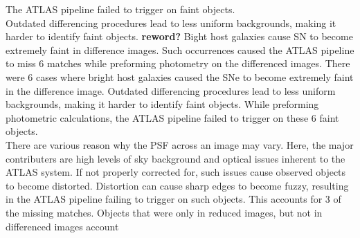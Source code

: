 	The ATLAS pipeline failed to trigger on faint objects. \\
	\indent Outdated differencing procedures lead to less uniform backgrounds, 
	making it harder to identify faint objects. {\bf reword?} 
	Bight host galaxies cause SN to become extremely faint in difference images. 
	Such occurrences caused the ATLAS pipeline to miss 6 matches while preforming 
	photometry on the differenced images.
\fi
\indent There were 6 cases where bright host galaxies caused the SNe to become extremely 
faint in the difference image. Outdated differencing procedures lead to less 
uniform backgrounds, making it harder to identify faint objects.  %
While preforming photometric calculations, the ATLAS pipeline failed to trigger 
on these 6 faint objects.\\
%
%
\indent There are various reason why the PSF across an image may vary.
Here, the major contributers are high levels of sky background and optical 
issues inherent to the ATLAS system. 
If not properly corrected for, such issues cause observed objects to become distorted. 
Distortion can cause sharp edges to become fuzzy, resulting in the ATLAS pipeline 
failing to trigger on such objects. This accounts for 3 of the missing matches.
Objects that were only in reduced images, but not in differenced images account 
